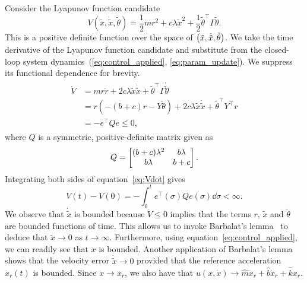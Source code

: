 Consider the Lyapunov function candidate
%
\begin{equation*}
    V(\tilde{x}, \dot{\tilde{x}}, \tilde{\theta}) = \frac{1}{2}mr^2 + 
    c\lambda\tilde{x}^2 + \frac{1}{2}\tilde{\theta}^\top\Gamma\tilde{\theta}.
\end{equation*}
%
This is a positive definite function over the space of $\begin{pmatrix}\tilde{x},
\dot{\tilde{x}}, \tilde{\theta}\end{pmatrix}$. We take the time derivative of the Lyapunov
function candidate and substitute from the closed-loop system
dynamics~(\ref{eq:control_applied}, \ref{eq:param_update}). We suppress its
functional dependence for brevity.
%
\begin{align}
    \begin{split}
    \dot{V} &= mr\dot{r} + 2c\lambda \tilde{x}\dot{\tilde{x}} +
    \tilde{\theta}^\top\Gamma\dot{\tilde{\theta}} \\
            &= r\left(-(b+c)r - Y\tilde{\theta}\right) + 2c\lambda
            \tilde{x}\dot{\tilde{x}} + \tilde{\theta}^\top Y^\top r \\
            &= -e^\top Qe \leq 0,
    \end{split}
    \label{eq:Vdot}
\end{align}
%
where $Q$ is a symmetric, positive-definite matrix given as \[ Q =
\begin{bmatrix}(b+c)\lambda^2 & b\lambda \\ b\lambda & b+c\end{bmatrix}. \]
%
%
%
Integrating both sides of equation~\eqref{eq:Vdot} gives \[ V(t) - V(0) =
-\int_0^t e^\top(\sigma) Q e(\sigma) \dd \sigma < \infty. \] We observe that
$\dot{\tilde{x}}$ is bounded because $\dot{V} \leq 0$ implies that the terms
$r$, $\tilde{x}$ and $\tilde{\theta}$ are bounded functions of time. This allows
us to invoke Barbalat's lemma~\cite{spong2020robot} to deduce that $\tilde{x}
\rightarrow 0$ as $t \rightarrow \infty$. Furthermore, using
equation~\eqref{eq:control_applied}, we can readily see that $\ddot{x}$ is
bounded. Another application of Barbalat's lemma shows that the velocity error
$\dot{\tilde{x}} \rightarrow 0$ provided that the reference acceleration
$\ddot{x}_r(t)$ is bounded. Since $x \rightarrow x_r$, we also have that $u(x,
\dot{x}) \rightarrow \hat{m}\ddot{x}_r + \hat{b}\dot{x}_r + \hat{k}x_r$.

